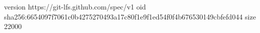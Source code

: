 version https://git-lfs.github.com/spec/v1
oid sha256:6654097f7061c0b4275270493a17c80f1e9f1ed54f0f4b676530149cbfefd044
size 22000
